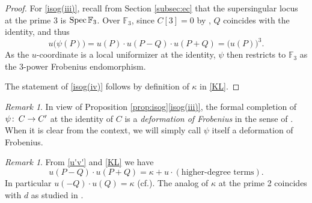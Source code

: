 \documentclass{gtpart}
\theoremstyle{definition}
\theoremstyle{remark}
\newtheorem{rmk}[thm]{Remark}
\def\co{\colon\thinspace}
\newcommand{\mb}[1]{\mathbb{#1}}
\newcommand{\Spec}{{\rm Spec\thinspace}}
\newcommand{\cf}{cf.\thinspace}
\newcommand{\BF}{{\mb F}}
\newcommand{\K}{\kappa}
\newcommand{\isog}[1]{Proposition \ref{prop:isog}\thinspace \eqref{isog(#1)}}
\begin{document}
\begin{proof}
 For \eqref{isog(iii)}, recall from Section \ref{subsec:ec} that the supersingular locus at the prime 3 is $\Spec \BF_3$.  
 Over $\BF_3$, since $C[3] = 0$ by \cite[V.3.1a]{AEC}, $Q$ coincides with the identity, and thus 
 \[
  u\big( \psi(P) \big) = u(P) \cdot u(P-Q) \cdot u(P+Q) = \big( u(P) \big)^3.  
 \]
 As the $u$-coordinate is a local uniformizer at the identity, $\psi$ then restricts to $\BF_3$ as the 3-power Frobenius endomorphism.  

 The statement of \eqref{isog(iv)} follows by definition of $\K$ in \eqref{KL}.  
\end{proof}

\begin{rmk}
 In view of \isog{iii}, the formal completion of $\psi \co C \to C'$ at the identity of $C$ 
 is a {\em deformation of Frobenius} in the sense of \cite[11.3]{cong}.  
 When it is clear from the context, we will simply call $\psi$ itself a deformation of Frobenius.  
\end{rmk}

\begin{rmk}
\label{rmk:K}
 From \eqref{u'v'} and \eqref{KL} we have 
 \begin{equation}
 \label{norm}
  u(P-Q) \cdot u(P+Q) = \K + u \cdot (\text{higher-degree terms}).  
 \end{equation}
 In particular $u(-Q) \cdot u(Q) = \K$ (\cf \cite[Proposition 7.5.2 and Section 7.7]{KM}).  
 The analog of $\K$ at the prime 2 coincides with $d$ as studied in \cite[Section 3]{h2p2}.  
\end{rmk}
\end{document}
